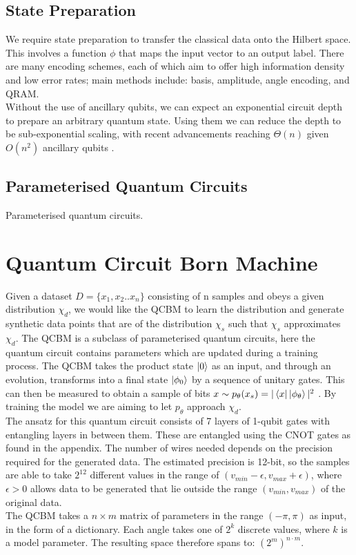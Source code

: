 \documentclass[12pt]{article}
\numberwithin{equation}{section}
\begin{document}
\subsection{State Preparation}
We require state preparation to transfer the classical data onto the 
Hilbert space. This involves a function $\phi$ that maps the input vector to 
an output label. There are many encoding schemes, each of which aim to offer 
high information density and low error rates; main methods include: basis, amplitude,
angle encoding, and QRAM. 
\\
Without the use of ancillary qubits, we can expect an exponential circuit depth
to prepare an arbitrary quantum state. Using them we can reduce the depth to be 
sub-exponential scaling, with recent advancements reaching $\Theta(n)$ given $O(n^2)$
ancillary qubits
\cite{shaib_efficient_2023,zhang_quantum_2022}.



\subsection{Parameterised Quantum Circuits}
Parameterised quantum circuits.

\clearpage
\section{Quantum Circuit Born Machine}
Given a dataset $D = \{x_1, x_2.. x_n\}$ consisting of n samples and obeys a 
given distribution $\chi_d$, we would like the QCBM to learn the distribution 
and generate synthetic data points that are of the distribution $\chi_s$ such that
$\chi_s$ approximates $\chi_d$.
The QCBM is a subclass of parameterised quantum circuits, 
here the quantum circuit contains parameters which are updated during a training 
process. The QCBM takes the product state $\ket{0}$ as an input, and through an 
evolution, transforms into a final state $\ket{\phi_0}$ by a sequence of unitary 
gates. This can then be measured to obtain a sample of bits 
$x \sim p_\theta (x_s)=|\bra{x}\ket{\phi_\theta}|^2$ . By training the model we 
are aiming to let $p_\theta$ approach $\chi_d$. 
\\
The ansatz for this quantum circuit consists of 7 layers
of 1-qubit gates with entangling layers in between them. These are 
entangled using the CNOT gates as found in the appendix. The number of wires 
needed depends on the precision required for the generated data. The estimated
precision is 12-bit, so the samples are able to take $2^{12}$ different values in 
the range of $ (v_{min} - \epsilon, v_{max} + \epsilon )$, where $\epsilon > 0 $
allows data to be generated that lie outside the range $(v_{min},v_{max})$ of the 
original data.
\\
The QCBM takes a $n \times m$ matrix of parameters in the range $(-\pi, \pi)$ as 
input, in the form of a dictionary. Each angle takes one of $2^k$ discrete values, 
where $k$ is a model parameter. The resulting space therefore spans to: 
$(2^m)^{n\cdot m}$.
\end{document}
